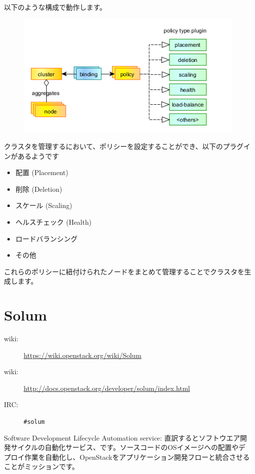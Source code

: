 以下のような構成で動作します。

\begin{figure}[htb]
	\begin{center}
		\includegraphics[width=\textwidth]{img/Senlin-policies.png}
	\end{center}
\end{figure}

クラスタを管理するにおいて、ポリシーを設定することができ、以下のプラグインがあるようです

\begin{itemize}
	\item 配置 (Placement)
	\item 削除 (Deletion)
	\item スケール (Scaling)
	\item ヘルスチェック (Health)
	\item ロードバランシング
	\item その他
\end{itemize}

これらのポリシーに紐付けられたノードをまとめて管理することでクラスタを生成します。

\section{Solum}

\begin{description}
	\item[wiki:] \url{https://wiki.openstack.org/wiki/Solum}
	\item[wiki:] \url{http://docs.openstack.org/developer/solum/index.html}
	\item[IRC:] \verb|#solum|
\end{description}

Software Development Lifecycle Automation service: 直訳するとソフトウエア開発サイクルの自動化サービス、です。ソースコードのOSイメージへの配置やデプロイ作業を自動化し、OpenStackをアプリケーション開発フローと統合させることがミッションです。

